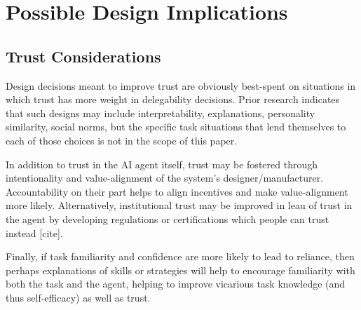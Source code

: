 \documentclass[letterpaper]{article} %
\begin{document}
\section{Possible Design Implications}

\subsection{Trust Considerations}
Design decisions meant to improve trust are obviously best-spent on situations in which trust has more weight in delegability decisions. Prior research indicates that such designs may include interpretability, explanations, personality similarity, social norms, but the specific task situations that lend themselves to each of those choices is not in the scope of this paper.

In addition to trust in the AI agent itself, trust may be fostered through intentionality and value-alignment of the system's designer/manufacturer. Accountability on their part helps to align incentives and make value-alignment more likely. Alternatively, institutional trust may be improved in leau of trust in the agent by developing regulations or certifications which people can trust instead [cite].

Finally, if task familiarity and confidence are more likely to lead to reliance, then perhaps explanations of skills or strategies will help to encourage familiarity with both the task and the agent, helping to improve vicarious task knowledge (and thus self-efficacy) as well as trust.




\end{document}
